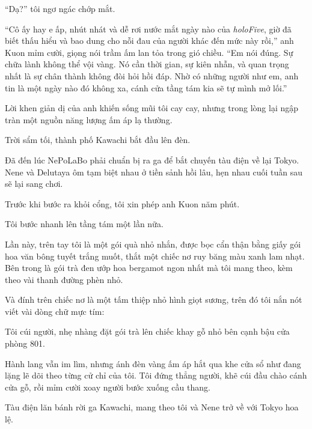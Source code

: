 \documentclass[../main.tex]{subfiles}
\begin{document}
``Dạ?'' tôi ngơ ngác chớp mắt.

``Cô ấy hay e ấp, nhút nhát và dễ rơi nước mắt ngày nào của \textit{holoFive}, giờ đã biết thấu hiểu và bao dung cho nỗi đau của người khác đến mức này rồi,'' anh Kuon mỉm cười, giọng nói trầm ấm lan tỏa trong gió chiều. ``Em nói đúng. Sự chữa lành không thể vội vàng. Nó cần thời gian, sự kiên nhẫn, và quan trọng nhất là sự chân thành không đòi hỏi hồi đáp. Nhờ có những người như em, anh tin là một ngày nào đó không xa, cánh cửa tầng tám kia sẽ tự mình mở lối.''

Lời khen giản dị của anh khiến sống mũi tôi cay cay, nhưng trong lòng lại ngập tràn một nguồn năng lượng ấm áp lạ thường.

\ct

Trời sẩm tối, thành phố Kawachi bắt đầu lên đèn.

Đã đến lúc NePoLaBo phải chuẩn bị ra ga để bắt chuyến tàu điện về lại Tokyo. Nene và Delutaya ôm tạm biệt nhau ở tiền sảnh hồi lâu, hẹn nhau cuối tuần sau sẽ lại sang chơi.

Trước khi bước ra khỏi cổng, tôi xin phép anh Kuon năm phút.

Tôi bước nhanh lên tầng tám một lần nữa.

Lần này, trên tay tôi là một gói quà nhỏ nhắn, được bọc cẩn thận bằng giấy gói hoa văn bông tuyết trắng muốt, thắt một chiếc nơ ruy băng màu xanh lam nhạt. Bên trong là gói trà đen ướp hoa bergamot ngon nhất mà tôi mang theo, kèm theo vài thanh đường phèn nhỏ.

Và đính trên chiếc nơ là một tấm thiệp nhỏ hình giọt sương, trên đó tôi nắn nót viết vài dòng chữ mực tím:


Tôi cúi người, nhẹ nhàng đặt gói trà lên chiếc khay gỗ nhỏ bên cạnh bậu cửa phòng 801.

Hành lang vẫn im lìm, nhưng ánh đèn vàng ấm áp hắt qua khe cửa sổ như đang lặng lẽ dõi theo từng cử chỉ của tôi. Tôi đứng thẳng người, khẽ cúi đầu chào cánh cửa gỗ, rồi mỉm cười xoay người bước xuống cầu thang.

Tàu điện lăn bánh rời ga Kawachi, mang theo tôi và Nene trở về với Tokyo hoa lệ.
\end{document}
